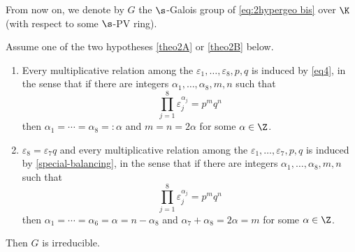 From now on, we denote by $G$ the $\s$-Galois group of \eqref{eq:2hypergeo bis} over $\K$ (with respect to some $\s$-PV ring).

\begin{theo}\label{theo2} Assume one of the two hypotheses \eqref{theo2A} or \eqref{theo2B} below.

\begin{enumerate}\renewcommand{\theenumi}{\Alph{enumi}}
\item\label{theo2A}
Every multiplicative relation among the $\varepsilon_{1},\dots,\varepsilon_{8},p,q$ is induced by \eqref{eq4}, in the sense that if there are integers $\alpha_{1},\dots,\alpha_{8},m,n$ such that
\[
\prod_{j=1}^{8}\varepsilon_{j}^{\alpha_{j}} =p^{m}q^{n}
\]
then $\alpha_{1}=\cdots=\alpha_{8}=:\alpha$ and $m=n=2\alpha$ for some $\alpha\in \Z$.

\item\label{theo2B}
$\varepsilon_8=\varepsilon_7q$ and every multiplicative relation among the $\varepsilon_{1},\dots,\varepsilon_{7},p,q$ is induced by \eqref{special-balancing}, in the sense that if there are integers $\alpha_{1},\dots,\alpha_{8},m,n$ such that
\[
\prod_{j=1}^{8}\varepsilon_{j}^{\alpha_{j}} =p^{m}q^{n}
\]
then $\alpha_{1}=\cdots=\alpha_{6}=\alpha=n-\alpha_8$ and $\alpha_7+\alpha_8=2\alpha=m$ for some $\alpha\in \Z$.
\end{enumerate}

Then $G$ is irreducible.
\end{theo}

